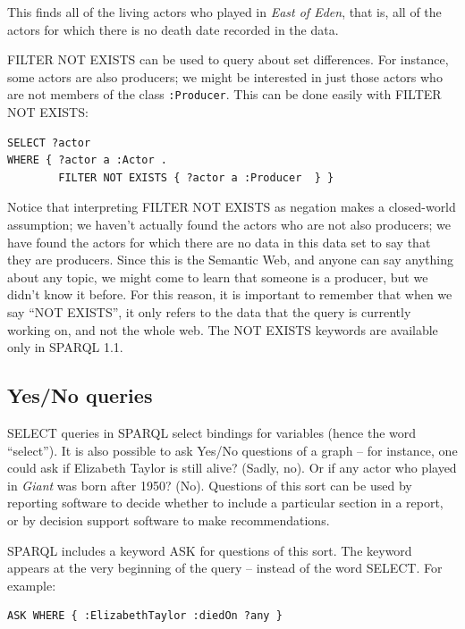 This finds all of the living actors who played in \emph{East of Eden},
that is, all of the actors for which there is no death date recorded in
the data.

FILTER NOT EXISTS can be used to query about set differences. For
instance, some actors are also producers; we might be interested in just
those actors who are not members of the class \texttt{:Producer}. This can be
done easily with FILTER NOT EXISTS:

\begin{lstlisting}
SELECT ?actor
WHERE { ?actor a :Actor .
        FILTER NOT EXISTS { ?actor a :Producer  } }
\end{lstlisting}

Notice that interpreting FILTER NOT EXISTS as negation makes a
closed-world assumption; we haven't actually found the actors who are
not also producers; we have found the actors for which there are no data
in this data set to say that they are producers. Since this is the
Semantic Web, and anyone can say anything about any topic, we might come
to learn that someone is a producer, but we didn't know it before. For
this reason, it is important to remember that when we say ``NOT
EXISTS'', it only refers to the data that the query is currently working
on, and not the whole web. The NOT EXISTS keywords are available only in
SPARQL 1.1.

\subsection{Yes/No queries}

SELECT queries in SPARQL select bindings for variables (hence the word
``select''). It is also possible to ask Yes/No questions of a graph --
for instance, one could ask if Elizabeth Taylor is still alive? (Sadly,
no). Or if any actor who played in \emph{Giant} was born after 1950?
(No). Questions of this sort can be used by reporting software to decide
whether to include a particular section in a report, or by decision
support software to make recommendations.

SPARQL includes a keyword ASK for questions of this sort. The keyword
appears at the very beginning of the query -- instead of the word
SELECT. For example:

\begin{lstlisting}
ASK WHERE { :ElizabethTaylor :diedOn ?any }
\end{lstlisting}

